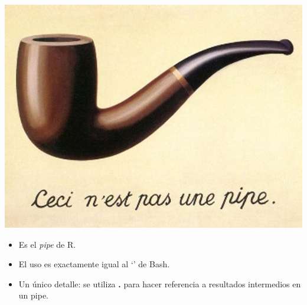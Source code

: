\documentclass[
  10pt,
  ignorenonframetext,
]{beamer}
\providecommand{\tightlist}{%
  \setlength{\itemsep}{0pt}\setlength{\parskip}{0pt}}
\begin{document}
\begin{frame}{}
\protect\hypertarget{section-2}{}

\begin{center}\includegraphics[height=0.6\textheight]{../../imgs/streamlining-with-magrittr} \end{center}

\begin{itemize}
\tightlist
\item
  Es el \emph{pipe} de R.
\item
  El uso es exactamente igual al `\textbar{}' de Bash.
\item
  Un único detalle: se utiliza \textbf{.} para hacer referencia a
  resultados intermedios en un pipe.
\end{itemize}
\end{frame}
\end{document}
